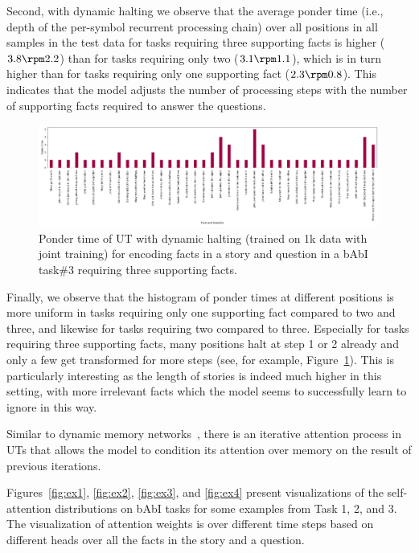 Second, with dynamic halting we observe that the average ponder time (i.e., depth of the per-symbol recurrent processing chain) over all positions in all samples in the test data for tasks requiring three supporting facts is higher ($3.8 \rpm 2.2$) than for tasks requiring only two ($3.1 \rpm 1.1$), which is in turn higher than for tasks requiring only one supporting fact ($2.3 \rpm 0.8$). This indicates that the model adjusts the number of processing steps with the number of supporting facts required to answer the questions. 
\begin{figure}[t]
 \centering
 \includegraphics[width=\textwidth]{04-part-03/chapter-06/figs_and_tables/fig_task3_example_ponder.png}
 \caption{Ponder time of UT with dynamic halting (trained on 1k data with joint training) for encoding facts in a story and question in a bAbI task\#3 requiring three supporting facts.}
 \label{fig:act_ponder}
\end{figure}
Finally, we observe that the histogram of ponder times at different positions is more uniform in tasks requiring only one supporting fact compared to two and three, and likewise for tasks requiring two compared to three.  Especially for tasks requiring three supporting facts, many positions halt at step 1 or 2 already and only a few get transformed for more steps (see, for example, Figure~\ref{fig:act_ponder}). This is particularly interesting as the length of stories is indeed much higher in this setting, with more irrelevant facts which the model seems to successfully learn to ignore in this way.

Similar to dynamic memory networks~\citep{kumar2016ask}, there is an iterative attention process in UTs that allows the model to condition its attention over memory on the result of previous iterations. 
%

Figures~\ref{fig:ex1}, \ref{fig:ex2}, \ref{fig:ex3}, and \ref{fig:ex4} present visualizations of the self-attention distributions on bAbI tasks for some examples from Task 1, 2, and 3. The visualization of attention weights is over different time steps based on different heads over all the facts in the story and a question. 

